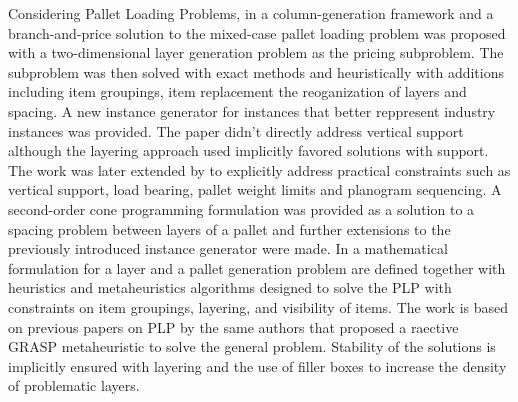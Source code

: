 Considering Pallet Loading Problems, in \citep{elhedhli2019three} a column-generation framework and a branch-and-price solution to the mixed-case pallet loading problem was proposed with a two-dimensional layer generation problem as the pricing subproblem.
The subproblem was then solved with exact methods and heuristically with additions including item groupings, item replacement the reoganization of layers and spacing.
A new instance generator for instances that better reppresent industry instances was provided. The paper didn't directly address vertical support although the layering approach used implicitly favored solutions with support.
The work was later extended by \citep{GZARA20201062} to explicitly address practical constraints such as vertical support, load bearing, pallet weight limits and planogram sequencing.
A second-order cone programming formulation was provided as a solution to a spacing problem between layers of a pallet and further extensions to the previously introduced instance generator were made.
In \citep{Calzavara2021} a mathematical formulation for a layer and a pallet generation problem are defined together with heuristics and metaheuristics algorithms designed to solve the PLP with constraints on item groupings, layering, and visibility of items.
The work is based on previous papers on PLP by the same authors \citep{Iori2020a, Iori2020b, Iori2021} that proposed a raective GRASP metaheuristic to solve the general problem.
Stability of the solutions is implicitly ensured with layering and the use of filler boxes to increase the density of problematic layers.

